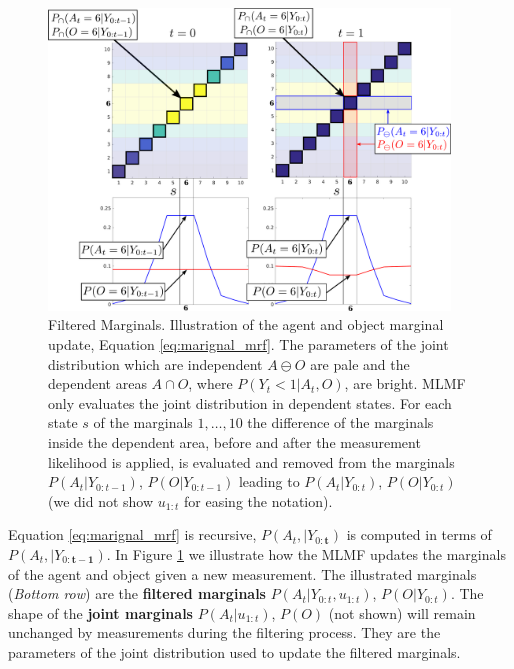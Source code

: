 \begin{figure}
\centering
\includegraphics[width=0.95\textwidth]{./ch5-MLMF/Figures/explenation/marginal_cal_example.pdf}
\caption{Filtered Marginals. Illustration of the agent and object marginal update, Equation \ref{eq:marignal_mrf}. The parameters of the joint 
distribution which are independent $A \ominus O$ are pale and the dependent areas $A \cap O$, where $P(Y_t<1|A_t,O)$, are bright. MLMF only
evaluates the joint distribution in dependent states. For each state $s$ of the marginals $1,\dots,10$ the difference 
of the marginals inside the dependent area, before and after the measurement likelihood is applied, is evaluated and removed from the marginals 
$P(A_t|Y_{0:t-1})$, $P(O|Y_{0:t-1})$ leading to $P(A_t|Y_{0:t})$, $P(O|Y_{0:t})$ (we did not show $u_{1:t}$ for easing the notation). }
\label{fig:ch5:marginal_update}
\end{figure}

Equation \ref{eq:marignal_mrf} is recursive, $P(A_t,|Y_{0:\mathbf{t}})$ is computed in terms of  $P(A_t,|Y_{0:\mathbf{t-1}})$. In 
Figure \ref{fig:ch5:marginal_update} we illustrate how the MLMF updates the marginals of the agent and object given a new measurement.
The illustrated marginals (\textit{Bottom row}) are the \textbf{filtered marginals} $P(A_t|Y_{0:t},u_{1:t})$, $P(O|Y_{0:t})$. The shape of the \textbf{joint marginals} $P(A_t|u_{1:t})$, $P(O)$
(not shown) will remain unchanged by measurements during the filtering process. They are the parameters of the joint distribution used to 
update the filtered marginals.



